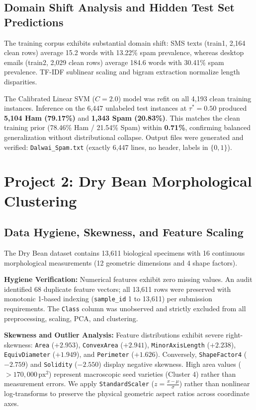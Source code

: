 \documentclass[10pt,onecolumn,letterpaper]{article}
\begin{document}
\subsection{Domain Shift Analysis and Hidden Test Set Predictions}
The training corpus exhibits substantial domain shift: SMS texts (train1, 2,164 clean rows) average 15.2 words with 13.22\% spam prevalence, whereas desktop emails (train2, 2,029 clean rows) average 184.6 words with 30.41\% spam prevalence. TF-IDF sublinear scaling and bigram extraction normalize length disparities.

The Calibrated Linear SVM ($C=2.0$) model was refit on all 4,193 clean training instances. Inference on the 6,447 unlabeled test instances at $\tau^*=0.50$ produced \textbf{5,104 Ham (79.17\%)} and \textbf{1,343 Spam (20.83\%)}. This matches the clean training prior (78.46\% Ham / 21.54\% Spam) within \textbf{0.71\%}, confirming balanced generalization without distributional collapse. Output files were generated and verified: \texttt{Dalwai\_Spam.txt} (exactly 6,447 lines, no header, labels in $\{0, 1\}$).

\section{Project 2: Dry Bean Morphological Clustering}

\subsection{Data Hygiene, Skewness, and Feature Scaling}
The Dry Bean dataset contains 13,611 biological specimens with 16 continuous morphological measurements (12 geometric dimensions and 4 shape factors).

\textbf{Hygiene Verification:} Numerical features exhibit zero missing values. An audit identified 68 duplicate feature vectors; all 13,611 rows were preserved with monotonic 1-based indexing (\texttt{sample\_id} 1 to 13,611) per submission requirements. The \texttt{Class} column was unobserved and strictly excluded from all preprocessing, scaling, PCA, and clustering.

\textbf{Skewness and Outlier Analysis:} Feature distributions exhibit severe right-skewness: \texttt{Area} ($+2.953$), \texttt{ConvexArea} ($+2.941$), \texttt{MinorAxisLength} ($+2.238$), \texttt{EquivDiameter} ($+1.949$), and \texttt{Perimeter} ($+1.626$). Conversely, \texttt{ShapeFactor4} ($-2.759$) and \texttt{Solidity} ($-2.550$) display negative skewness. High area values ($>170{,}000\,\text{px}^2$) represent macroscopic seed varieties (Cluster 4) rather than measurement errors. We apply \texttt{StandardScaler} ($z = \frac{x - \mu}{\sigma}$) rather than nonlinear log-transforms to preserve the physical geometric aspect ratios across coordinate axes.
\end{document}
